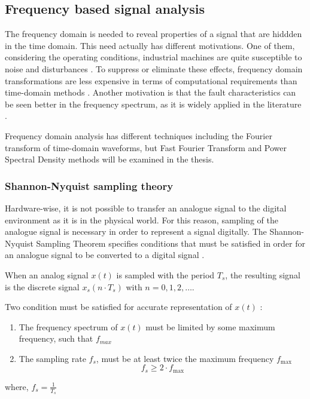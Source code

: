 \subsection{Frequency based signal analysis}

The frequency domain is needed to reveal properties of a signal that are hiddden in the time domain. This need actually has different motivations. One of them, considering the operating conditions, industrial machines are quite susceptible to noise and disturbances \cite{cernuda2019relevance,allen2004signal}. To suppress or eliminate these effects, frequency domain transformations are less expensive in terms of computational requirements than time-domain methods \cite{ahmed2019condition,cernuda2019relevance}. Another motivation is that the fault characteristics can be seen better in the frequency spectrum, as it is widely applied in the literature \cite{ahmed2019condition}.

Frequency domain analysis has different techniques including the Fourier transform of time-domain waveforms, but Fast Fourier Transform and Power Spectral Density methods will be examined in the thesis.

\subsubsection{Shannon-Nyquist sampling theory}

Hardware-wise, it is not possible to transfer an analogue signal to the digital environment as it is in the physical world. For this reason, sampling of the analogue signal is necessary in order to represent a signal digitally. The Shannon-Nyquist Sampling Theorem specifies conditions that must be satisfied in order for an analogue signal to be converted to a digital signal \cite{orfanidis1995introduction}. 

When an analog signal $x(t)$ is sampled with the period $T_s$, the resulting signal is the discrete signal $x_s(n\cdot T_s)$ with $n=0,1,2,\ldots$. 

Two condition must be satisfied for accurate representation of $x(t)$ \cite{orfanidis1995introduction}:
\begin{enumerate}
	\item The frequency spectrum of $x(t)$ must be limited by some maximum frequency, such that $f_{max}$ 
	\item The sampling rate $f_{s}$, must be at least twice the maximum frequency $f_{\max }$
	$$
	f_{s} \geq 2\cdot f_{\max }
	$$
\end{enumerate}
where, $f_s = \displaystyle\frac{1}{T_s}$


